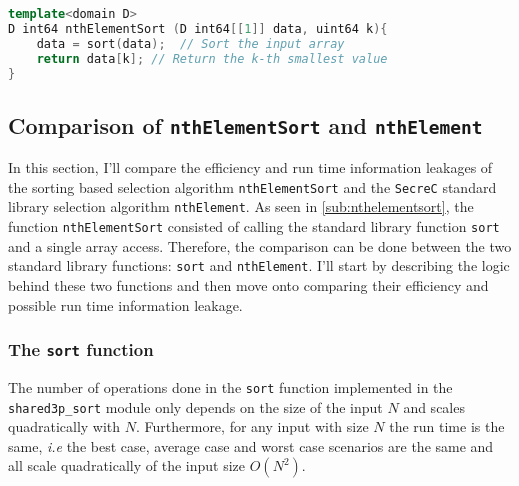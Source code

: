 \documentclass[11pt]{article}
\newcommand{\ct}[1]{\texttt{#1}}
\newcommand{\SC}{\ct{SecreC}\xspace}
\begin{document}
\begin{lstlisting}[caption={The \ct{nthElementSort} function, which is templated on the privacy type \ct{D}.}, label={lst:nthElementSort}, language=C++]
template<domain D>
D int64 nthElementSort (D int64[[1]] data, uint64 k){    
    data = sort(data); 	// Sort the input array
    return data[k];	// Return the k-th smallest value
}
\end{lstlisting}



\subsection{Comparison of \ct{nthElementSort} and \ct{nthElement}} %
\label{sub:comparison_of_nthelementsort_and_nthelement}

In this section, I'll compare the efficiency and run time information leakages of the sorting based selection algorithm \ct{nthElementSort} and the \SC standard library selection algorithm \ct{nthElement}. As seen in \cref{sub:nthelementsort}, the function \ct{nthElementSort} consisted of calling the standard library function \ct{sort} and a single array access. Therefore, the comparison can be done between the two standard library functions: \ct{sort} and \ct{nthElement}. I'll start by describing the logic behind these two functions and then move onto comparing their efficiency and possible run time information leakage.

\subsubsection{The \ct{sort} function} %
\label{ssub:the_sort_function}
 
The number of operations done in the \ct{sort} function implemented in the \ct{shared3p\_sort} module only depends on the size of the input $N$ and scales quadratically with $N$. Furthermore, for any input with size $N$ the run time is the same, \emph{i.e} the best case, average case and worst case scenarios are the same and all scale quadratically of the input size $O(N^2)$.   

\end{document}
